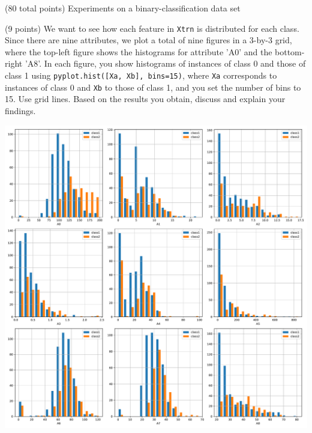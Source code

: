 \documentclass[12pt]{article}
\begin{document}
\clearpage
%
%
\newcommand{\qOneTitle}{Experiments on a binary-classification data set}
%

  \begin{question}{(80 total points) \qOneTitle}




%
%
%
\medskip

\begin{subquestion}{(9 points)
    We want to see how each feature in {\tt Xtrn} is distributed for each class.
    Since there are nine attributes, we plot a total of nine figures in a 3-by-3 grid, where the top-left figure shows the histograms for attribute 'A0' and the bottom-right 'A8'.
    In each figure, you show histograms of instances of class 0 and those of class 1 using {\tt pyplot.hist([Xa, Xb], bins=15)}, where {\tt Xa} corresponds to instances of class 0 and {\tt Xb} to those of class 1, and you set the number of bins to 15. Use grid lines.
    Based on the results you obtain, discuss and explain your findings.
  } \label{Q1.1}


  \begin{answerbox}{0.78\textheight}
  \begin{center}
  \includegraphics[scale=0.45]{attribute_hist.pdf}
  \end{center}
  

\end{answerbox}
\end{subquestion}
\end{question}
\end{document}
